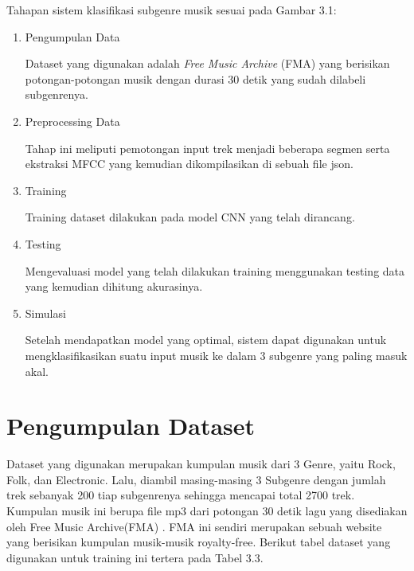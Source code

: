Tahapan sistem klasifikasi subgenre musik sesuai pada Gambar 3.1:

\begin{enumerate}
	\item Pengumpulan Data
	
	Dataset yang digunakan adalah \emph{Free Music Archive} (FMA) \citep{DBLP:journals/corr/BenziDVB16} yang berisikan potongan-potongan musik dengan durasi 30 detik yang sudah dilabeli subgenrenya.
	\item Preprocessing Data
	
	Tahap ini meliputi pemotongan input trek menjadi beberapa segmen serta ekstraksi MFCC yang kemudian dikompilasikan di sebuah file json.
	\item Training
	
	Training dataset dilakukan pada model CNN yang telah dirancang.
	
	\item Testing
	
	Mengevaluasi model yang telah dilakukan training menggunakan testing data yang kemudian dihitung akurasinya.
	
	\item Simulasi
	
	Setelah mendapatkan model yang optimal, sistem dapat digunakan untuk mengklasifikasikan suatu input musik ke dalam 3 subgenre yang paling masuk akal.
	
\end{enumerate}

\section{Pengumpulan Dataset}
\label{sec:pengumpulan dataset}

Dataset yang digunakan merupakan kumpulan musik dari 3 Genre, yaitu Rock, Folk, dan Electronic. Lalu, diambil masing-masing 3 Subgenre dengan jumlah trek sebanyak 200 tiap subgenrenya sehingga mencapai total 2700 trek. Kumpulan musik ini berupa file mp3 dari potongan 30 detik lagu yang disediakan oleh Free Music Archive(FMA) \citep{DBLP:journals/corr/BenziDVB16}. FMA ini sendiri merupakan sebuah website yang berisikan kumpulan musik-musik royalty-free. Berikut tabel dataset yang digunakan untuk training ini tertera pada Tabel 3.3.

